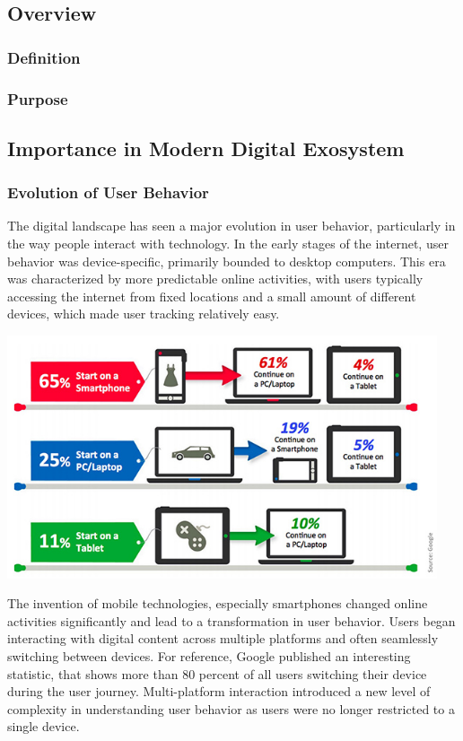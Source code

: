 \subsection{Overview}
\subsubsection{Definition}
\subsubsection{Purpose}
\subsection{Importance in Modern Digital Exosystem}

\subsubsection{Evolution of User Behavior}
The digital landscape has seen a major evolution in user behavior, particularly in the way people interact with technology. In the early stages of the internet, user behavior was device-specific, primarily bounded to desktop computers. This era was characterized by more predictable online activities, with users typically accessing the internet from fixed locations and a small amount of different devices, which made user tracking relatively easy.

\vspace{0.8cm}
\includegraphics[width=0.95\textwidth]{./assets/google-cdt-stats.jpeg}
\vspace{0.8cm}

The invention of mobile technologies, especially smartphones changed online activities significantly and lead to a transformation in user behavior. Users began interacting with digital content across multiple platforms and often seamlessly switching between devices. For reference, Google published an interesting statistic, that shows more than 80 percent of all users switching their device during the user journey. Multi-platform interaction introduced a new level of complexity in understanding user behavior as users were no longer restricted to a single device.

